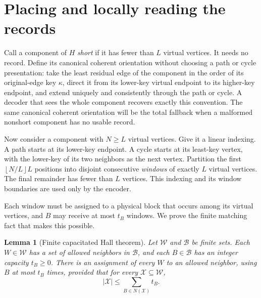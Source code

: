 \documentclass[11pt]{article}
\newtheorem{lemma}[theorem]{Lemma}
\theoremstyle{definition}
\theoremstyle{remark}
\newcommand{\floor}[1]{\left\lfloor #1\right\rfloor}
\begin{document}
\section{Placing and locally reading the records}
\label{sec:records}

Call a component of $H$ \emph{short} if it has fewer than $L$ virtual
vertices.  It needs no record.  Define its canonical coherent orientation
without choosing a path or cycle presentation: take the least residual edge
of the component in the order of its original-edge key $\kappa$, direct it from its lower-key
virtual endpoint to its higher-key endpoint, and extend uniquely and
consistently through the path or cycle.  A decoder that sees the whole
component recovers exactly this convention.  The same canonical coherent
orientation will be the total fallback when a malformed nonshort component
has no usable record.

Now consider a component with $N\ge L$ virtual vertices.  Give it a linear
indexing.  A path starts at its lower-key endpoint.  A cycle starts at its
least-key vertex, with the lower-key of its two neighbors as the next
vertex.  Partition the first $\floor{N/L}L$ positions into disjoint
consecutive \emph{windows} of exactly $L$ virtual vertices.  The final
remainder has fewer than $L$ vertices.  This indexing and its window
boundaries are used only by the encoder.

Each window must be assigned to a physical block that occurs among its
virtual vertices, and $B$ may receive at most $t_B$ windows.  We prove the
finite matching fact that makes this possible.

\begin{lemma}[Finite capacitated Hall theorem]
\label{lem:capacitated-hall}
Let $\mathcal W$ and $\mathcal B$ be finite sets.  Each
$W\in\mathcal W$ has a set of allowed neighbors in $\mathcal B$, and each
$B\in\mathcal B$ has an integer capacity $t_B\ge0$.  There is an assignment
of every $W$ to an allowed neighbor, using $B$ at most $t_B$ times, provided
that for every $\mathcal X\subseteq\mathcal W$,
\[
                 |\mathcal X|\le
                 \sum_{B\in N(\mathcal X)}t_B.                 \tag{7.1}
\]
\end{lemma}
\end{document}
